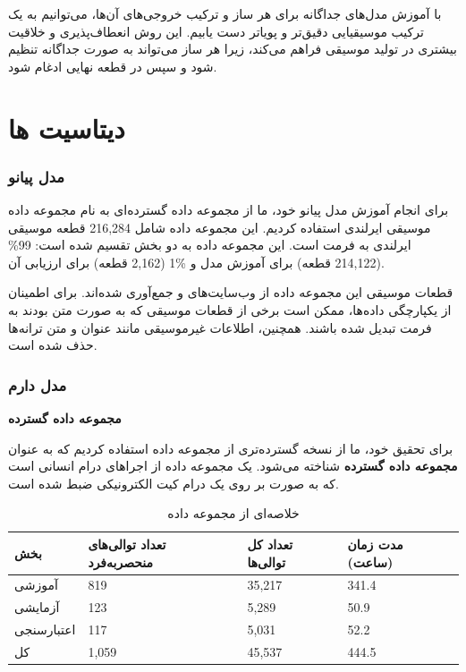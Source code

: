 با آموزش مدل‌های جداگانه برای هر ساز و ترکیب خروجی‌های آن‌ها، می‌توانیم به یک ترکیب موسیقیایی دقیق‌تر و پویا‌تر دست یابیم. این روش انعطاف‌پذیری و خلاقیت بیشتری در تولید موسیقی فراهم می‌کند، زیرا هر ساز می‌تواند به صورت جداگانه تنظیم شود و سپس در قطعه نهایی ادغام شود.

\section{دیتاسیت ها}
\subsubsection{مدل پیانو}

برای انجام آموزش مدل پیانو خود، ما از مجموعه داده گسترده‌ای به نام مجموعه داده  موسیقی ایرلندی  \cite{DBLP:conf/hcmir/WuLY023} استفاده کردیم. این مجموعه داده شامل 216,284 قطعه موسیقی ایرلندی به فرمت  است. این مجموعه داده به دو بخش تقسیم شده است: 99\% (214,122 قطعه) برای آموزش مدل و \%1 (2,162 قطعه) برای ارزیابی آن.

قطعات موسیقی این مجموعه داده از وب‌سایت‌های  و  جمع‌آوری شده‌اند. برای اطمینان از یکپارچگی داده‌ها، ممکن است برخی از قطعات موسیقی که به صورت متن بودند به فرمت  تبدیل شده باشند. همچنین، اطلاعات غیرموسیقی مانند عنوان و متن ترانه‌ها حذف شده است.
\subsubsection{مدل دارم}
\textbf{مجموعه داده گسترده  \cite{callender2020improving}}

برای تحقیق خود، ما از نسخه گسترده‌تری از مجموعه داده 
استفاده کردیم که به عنوان \textbf{مجموعه داده گسترده }
شناخته می‌شود.  یک مجموعه داده از اجراهای درام انسانی است که به صورت
 بر روی یک درام کیت الکترونیکی  ضبط شده است.

\begin{table}[!ht]
      \centering
      \begin{tabular}{|l|l|l|l|}
            \hline
            بخش        & تعداد توالی‌های منحصربه‌فرد & تعداد کل توالی‌ها & مدت زمان (ساعت) \\ \hline
            آموزشی     & 819                       & 35,217           & 341.4           \\ \hline
            آزمایشی    & 123                       & 5,289            & 50.9            \\ \hline
            اعتبارسنجی & 117                       & 5,031            & 52.2            \\ \hline
            کل         & 1,059                     & 45,537           & 444.5           \\ \hline
      \end{tabular}
      \caption{خلاصه‌ای از مجموعه داده}
      \label{drumInfo}
\end{table}

